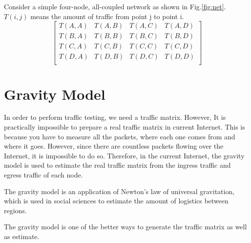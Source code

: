 \begin{screen}
  \begin{dfn}
    Consider a simple four-node, all-coupled network as shown in Fig.\ref{fig:net}.
    $T(i,j)$ means the amount of traffic from point j to point i. 
      \begin{equation}
          \begin{bmatrix}
            T(A,A) & T(A,B) & T(A,C) & T(A,D) \\
            T(B,A) & T(B,B) & T(B,C) & T(B,D) \\
            T(C,A) & T(C,B) & T(C,C) & T(C,D) \\
            T(D,A) & T(D,B) & T(D,C) & T(D,D) \\
          \end{bmatrix}
      \end{equation}
  \end{dfn}
\end{screen}



\section{Gravity Model}
In order to perform traffic testing, we need a traffic matrix.
However, It is practically impossible to prepare a real traffic matrix in current Internet.
This is because you have to measure all the packets, where each one comes from and where it goes. 
However, since there are countless packets flowing over the Internet, it is impossible to do so.
Therefore, in the current Internet, the gravity model is used to estimate the real traffic matrix from the ingress traffic and egress traffic of each node.

The gravity model is an application of Newton's law of universal gravitation, which is used in social sciences to estimate the amount of logistics between regions.

The gravity model is one of the better ways to generate the traffic matrix as well as estimate.

